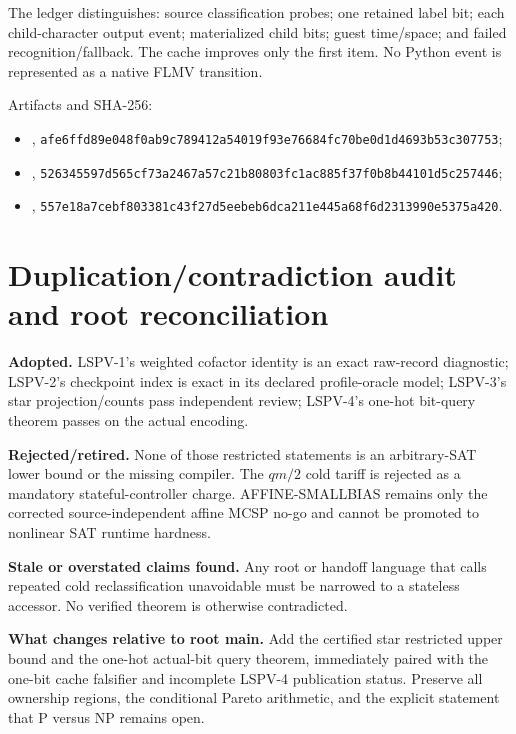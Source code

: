 \documentclass[11pt]{article}
\begin{document}
The ledger distinguishes: source classification probes; one retained label bit;
each child-character output event; materialized child bits; guest time/space;
and failed recognition/fallback.  The cache improves only the first item.
No Python event is represented as a native FLMV transition.

Artifacts and SHA-256:
\begin{itemize}
\item {},
\texttt{afe6ffd89e048f0ab9c789412a54019f93e76684fc70be0d1d4693b53c307753};
\item {},
\texttt{526345597d565cf73a2467a57c21b80803fc1ac885f37f0b8b44101d5c257446};
\item {},
\texttt{557e18a7cebf803381c43f27d5eebeb6dca211e445a68f6d2313990e5375a420}.
\end{itemize}

\section{Duplication/contradiction audit and root reconciliation}
\textbf{Adopted.} LSPV-1's weighted cofactor identity is an exact raw-record
diagnostic; LSPV-2's checkpoint index is exact in its declared profile-oracle
model; LSPV-3's star projection/counts pass independent review; LSPV-4's
one-hot bit-query theorem passes on the actual encoding.

\textbf{Rejected/retired.} None of those restricted statements is an
arbitrary-SAT lower bound or the missing compiler.  The $q m/2$ cold tariff is
rejected as a mandatory stateful-controller charge.  AFFINE-SMALLBIAS remains
only the corrected source-independent affine MCSP no-go and cannot be promoted
to nonlinear SAT runtime hardness.

\textbf{Stale or overstated claims found.} Any root or handoff language that
calls repeated cold reclassification unavoidable must be narrowed to a
stateless accessor.  No verified theorem is otherwise contradicted.

\textbf{What changes relative to root main.} Add the certified star restricted
upper bound and the one-hot actual-bit query theorem, immediately paired with
the one-bit cache falsifier and incomplete LSPV-4 publication status.  Preserve
all ownership regions, the conditional Pareto arithmetic, and the explicit
statement that P versus NP remains open.
\end{document}
